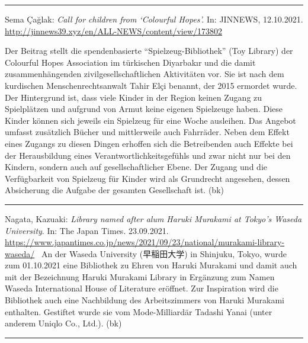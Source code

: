 \documentclass[a4paper,
fontsize=11pt,
oneside,
numbers=noperiodatend,
parskip=half-,
bibliography=totoc,
final
]{scrartcl}
\begin{document}
\begin{center}\rule{0.5\linewidth}{0.5pt}\end{center}

Sema Çağlak: \emph{Call for children from \enquote*{Colourful Hopes}.}
In: JINNEWS, 12.10.2021.
\url{http://jinnews39.xyz/en/ALL-NEWS/content/view/173802}

Der Beitrag stellt die spendenbasierte \enquote{Spielzeug-Bibliothek}
(Toy Library) der Colourful Hopes Association im türkischen Diyarbakır
und die damit zusammenhängenden zivilgesellschaftlichen Aktivitäten vor.
Sie ist nach dem kurdischen Menschenrechtsanwalt Tahir Elçi benannt, der
2015 ermordet wurde. Der Hintergrund ist, dass viele Kinder in der
Region keinen Zugang zu Spielplätzen und aufgrund von Armut keine
eigenen Spielzeuge haben. Diese Kinder können sich jeweils ein Spielzeug
für eine Woche ausleihen. Das Angebot umfasst zusätzlich Bücher und
mittlerweile auch Fahrräder. Neben dem Effekt eines Zugangs zu diesen
Dingen erhoffen sich die Betreibenden auch Effekte bei der Herausbildung
eines Verantwortlichkeitsgefühls und zwar nicht nur bei den Kindern,
sondern auch auf gesellschaftlicher Ebene. Der Zugang und die
Verfügbarkeit von Spielzeug für Kinder wird als Grundrecht angesehen,
dessen Absicherung die Aufgabe der gesamten Gesellschaft ist. (bk)

\begin{center}\rule{0.5\linewidth}{0.5pt}\end{center}

\begin{CJK}{UTF8}{ipxm}
Nagata, Kazuaki: \emph{Library named after alum Haruki Murakami at
Tokyo's Waseda University}. In: The Japan Times. 23.09.2021.
\url{https://www.japantimes.co.jp/news/2021/09/23/national/murakami-library-waseda/}
\
An der Waseda University (早稲田大学) in Shinjuku, Tokyo, wurde zum
01.10.2021 eine Bibliothek zu Ehren von Haruki Murakami und damit auch
mit der Bezeichnung Haruki Murakami Library in Ergänzung zum Namen
Waseda International House of Literature eröffnet. Zur Inspiration wird
die Bibliothek auch eine Nachbildung des Arbeitszimmers von Haruki
Murakami enthalten. Gestiftet wurde sie vom Mode-Milliardär Tadashi
Yanai (unter anderem Uniqlo Co., Ltd.). (bk)

\end{CJK}

\begin{center}\rule{0.5\linewidth}{0.5pt}\end{center}
\end{document}
